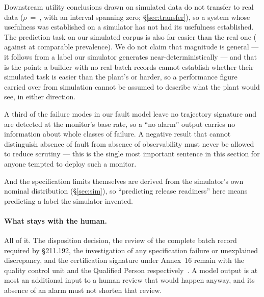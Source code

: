 \documentclass[11pt]{article}
\begin{document}
Downstream utility conclusions drawn on simulated data do not transfer to real
data ($\rho$~=~\ciAuprcRho{}, with an interval spanning zero; \S\ref{sec:transfer}),
so a
system whose usefulness was established on a simulator has not had its usefulness
established. The prediction task on our simulated corpus is also far easier than the real one
(\trtrAuprcSim{} against \trtrAuprcReal{} at comparable prevalence). We do not
claim that magnitude is general --- it follows from a label our simulator
generates near-deterministically --- and that is the point: a builder with no
real batch records cannot establish whether their simulated task is easier than
the plant's or harder, so a performance figure carried over from simulation
cannot be assumed to describe what the plant would see, in either direction.

A third of the failure modes in our fault model leave no trajectory signature and
are detected at the monitor's base rate, so a ``no alarm'' output carries no
information about whole classes of failure. A negative result that cannot
distinguish absence of fault from absence of observability must never be allowed
to reduce scrutiny --- this is the single most important sentence in this section
for anyone tempted to deploy such a monitor.

And the specification limits themselves are derived from the simulator's own
nominal distribution (\S\ref{sec:sim}), so ``predicting release readiness'' here
means predicting a label the simulator invented.

\paragraph{What stays with the human.} All of it. The disposition decision, the
review of the complete batch record required by \S211.192, the investigation of
any specification failure or unexplained discrepancy, and the certification
signature under Annex~16 remain with the quality control unit and the Qualified
Person respectively~\citep{cfr211,eudralex2015annex16}. A model output is at most
an additional input to a human review that would happen anyway, and its absence
of an alarm must not shorten that review.
\end{document}
